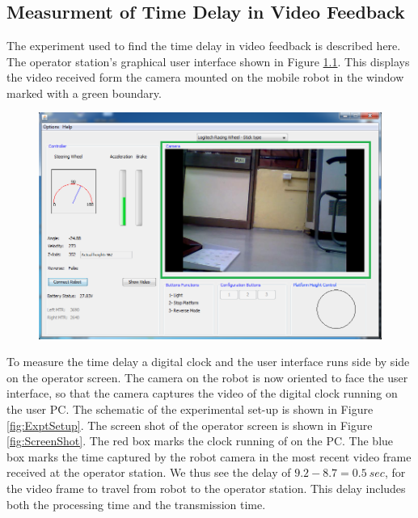 \chapter{ }
\section{Measurment of Time Delay in Video Feedback}
\label{app:DH}
The experiment used to find the time delay in video feedback is described here. The operator station's graphical user interface shown in Figure \ref{fig:Gui2}. This displays the video received form the camera mounted on the mobile robot  in the window marked with a green boundary.   
\begin{figure}
	\includegraphics[width=\linewidth,keepaspectratio]{Chapter5/fig/gui1}
	\label{fig:Gui2} 
\end{figure}

To measure the time delay a digital clock and the user interface runs side by side on the operator screen. The camera on the robot is now oriented to face the user interface, so that the camera captures the video of the digital clock running on the user PC. The schematic of the experimental set-up is shown in Figure \ref{fig:ExptSetup}. The screen shot of the operator screen is shown in Figure \ref{fig:ScreenShot}. The red box marks the clock running of on the PC. The blue box marks the time captured by the robot camera in the most recent video frame received at the operator station. We thus see the delay  of $9.2-8.7=0.5~sec$, for the video frame to travel from robot to the operator station. This delay includes both the processing time and the transmission time.

